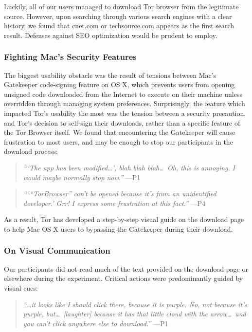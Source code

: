 \documentclass[letterpaper,twocolumn,11pt]{article}
\begin{document}
Luckily, all of our users managed to download Tor browser from the legitimate source. However, 
upon searching through various search engines with a clear history, we found that cnet.com or techsource.com 
 appears as the first search result. Defenses against SEO optimization would be prudent to employ. 

\subsubsection{Fighting Mac's Security Features}
The biggest usability obstacle was the result of tensions between Mac's Gatekeeper 
code-signing feature on OS X, which prevents users from opening unsigned code 
downloaded from the Internet to execute on their machine unless overridden through
managing system preferences. Surprisingly, the feature which impacted Tor's usability
the most was the tension between a security precaution, and Tor's decision to self-sign
their downloads, rather than a specific feature of the Tor Browser itself. We found that 
encountering the Gatekeeper will cause frustration to most users, and may be enough 
to stop our participants in the download process: 

\begin{quote}{\it
``\/`The app has been modified\ldots', blah blah blah\ldots\  Oh, this is annoying. I would maybe normally stop now.''} \mbox{---P1}
\end{quote}

\begin{quote}{\it
``\/`\/``TorBrowser'' can't be opened because it's from an unidentified developer.'
Grr! I express some frustration at this fact.''} \mbox{---P4}
\end{quote}

As a result, Tor has developed a step-by-step visual guide on the download page to 
help Mac OS X users to bypassing the Gatekeeper during their download. 

\subsubsection{On Visual Communication}
Our participants did not read much of the text provided on the download page or elsewhere during 
the experiment. Critical actions were predominantly guided by visual cues:

\begin{quote}{\it
``\ldots it looks like I should click there, because it is purple. No, not because it's purple, but\ldots\ 
[laughter] because it has that little cloud with the arrow\ldots\ and you can't click anywhere else to download.''} \mbox{---P1} 
\end{quote}
\end{document}
